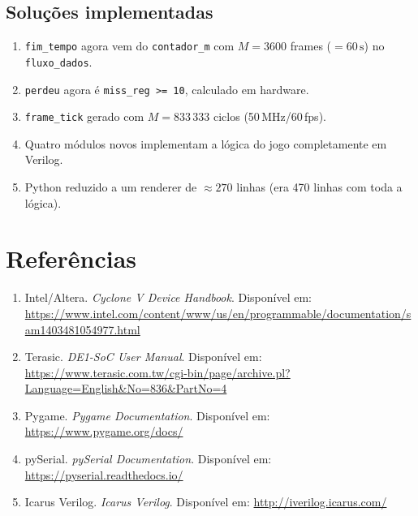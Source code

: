 \documentclass[12pt,a4paper]{article}
\begin{document}
\subsection{Soluções implementadas}

\begin{enumerate}
    \item \texttt{fim\_tempo} agora vem do \texttt{contador\_m} com $M=3600$ frames ($=60\,\text{s}$) no \texttt{fluxo\_dados}.
    \item \texttt{perdeu} agora é \texttt{miss\_reg >= 10}, calculado em hardware.
    \item \texttt{frame\_tick} gerado com $M=833\,333$ ciclos (50\,MHz/60\,fps).
    \item Quatro módulos novos implementam a lógica do jogo completamente em Verilog.
    \item Python reduzido a um renderer de $\approx 270$ linhas (era 470 linhas com toda a lógica).
\end{enumerate}

\section*{Referências}

\begin{enumerate}
    \item Intel/Altera. \textit{Cyclone V Device Handbook}. Disponível em: \url{https://www.intel.com/content/www/us/en/programmable/documentation/sam1403481054977.html}
    \item Terasic. \textit{DE1-SoC User Manual}. Disponível em: \url{https://www.terasic.com.tw/cgi-bin/page/archive.pl?Language=English&No=836&PartNo=4}
    \item Pygame. \textit{Pygame Documentation}. Disponível em: \url{https://www.pygame.org/docs/}
    \item pySerial. \textit{pySerial Documentation}. Disponível em: \url{https://pyserial.readthedocs.io/}
    \item Icarus Verilog. \textit{Icarus Verilog}. Disponível em: \url{http://iverilog.icarus.com/}
\end{enumerate}
\end{document}
